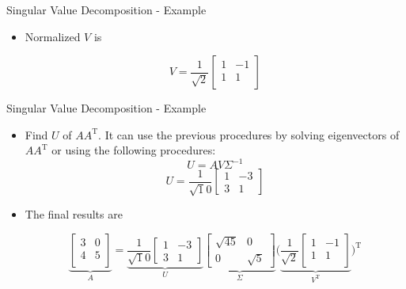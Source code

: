 \begin{frame}[t]{Singular Value Decomposition - Example}
\begin{itemize}
    \item Normalized $V$ is

        \begin{equation*}
        V=\frac{1}{\sqrt 2}
        \begin{bmatrix}
            1 & -1 \\
            1 & 1 \\
        \end{bmatrix}
    \end{equation*}

    \end{itemize}

\end{frame}    

\begin{frame}[t]{Singular Value Decomposition - Example}
\begin{itemize}
    \item Find $U$ of $AA^{\text{T}}$. It can use the previous procedures by
        solving eigenvectors of $AA^{\text{T}}$ or using the following
        procedures:
        \begin{equation*}
            U = A V \Sigma^{-1}
        \end{equation*}   
        \begin{equation*}
            U = \frac{1}{\sqrt 10}
            \begin{bmatrix}
                1 & -3 \\
                3 & 1 
            \end{bmatrix}
        \end{equation*}   
    \item The final results are

    \begin{equation*}
        \underbrace{
        \begin{bmatrix}
            3 & 0 \\
            4 & 5 \\
        \end{bmatrix}}_{A}
        =
        \underbrace{
        \frac{1}{\sqrt 10}
        \begin{bmatrix}
            1 & -3 \\
            3 & 1 
        \end{bmatrix}}_{U}
        \underbrace{
    	\begin{bmatrix}
            \sqrt{45} & 0 \\ 0 & \sqrt{5}
        \end{bmatrix}}_{\Sigma}
        \bigg(
        \underbrace{
        \frac{1}{\sqrt 2}
        \begin{bmatrix}
            1 & -1 \\
            1 & 1 \\
        \end{bmatrix}}_{V^{\text{T}}}\bigg)^{\text{T}}
    \end{equation*}

\end{itemize}
\end{frame}    
